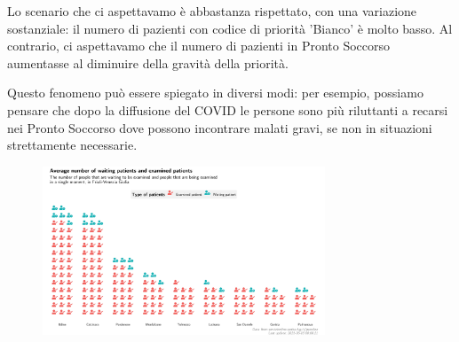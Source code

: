 \documentclass[8pt,english,aspectratio=169]{beamer}
\begin{document}
\begin{frame}
{Lo scenario che ci aspettavamo è abbastanza rispettato, con una variazione sostanziale: il numero di pazienti con codice di priorità 'Bianco' è molto basso.
Al contrario, ci aspettavamo che il numero di pazienti in Pronto Soccorso aumentasse al diminuire della gravità della priorità.

Questo fenomeno può essere spiegato in diversi modi: per esempio, possiamo pensare che dopo la diffusione del COVID le persone sono più riluttanti a recarsi nei Pronto Soccorso dove possono incontrare malati gravi, se non in situazioni strettamente necessarie.}
\end{frame}

\begin{frame}
\begin{figure}
  \centering
  \includegraphics[width=0.75\textwidth]{../images/08_waiting-examined_waffle.jpg}
\end{figure}
\end{frame}
\end{document}
